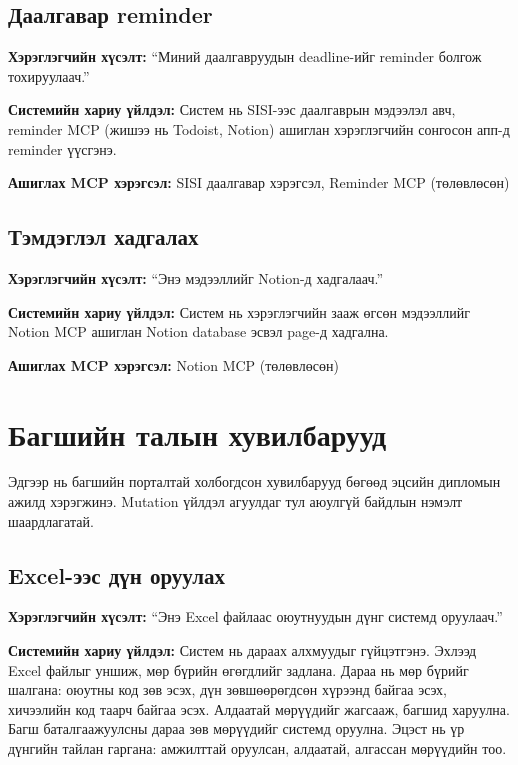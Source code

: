 \subsection{Даалгавар reminder}

\textbf{Хэрэглэгчийн хүсэлт:} ``Миний даалгавруудын deadline-ийг reminder болгож тохируулаач.''

\textbf{Системийн хариу үйлдэл:} Систем нь SISI-ээс даалгаврын мэдээлэл авч, reminder MCP (жишээ нь Todoist, Notion) ашиглан хэрэглэгчийн сонгосон апп-д reminder үүсгэнэ.

\textbf{Ашиглах MCP хэрэгсэл:} SISI даалгавар хэрэгсэл, Reminder MCP (төлөвлөсөн)

\subsection{Тэмдэглэл хадгалах}

\textbf{Хэрэглэгчийн хүсэлт:} ``Энэ мэдээллийг Notion-д хадгалаач.''

\textbf{Системийн хариу үйлдэл:} Систем нь хэрэглэгчийн зааж өгсөн мэдээллийг Notion MCP ашиглан Notion database эсвэл page-д хадгална.

\textbf{Ашиглах MCP хэрэгсэл:} Notion MCP (төлөвлөсөн)

\section{Багшийн талын хувилбарууд}

Эдгээр нь багшийн порталтай холбогдсон хувилбарууд бөгөөд эцсийн дипломын ажилд хэрэгжинэ. Mutation үйлдэл агуулдаг тул аюулгүй байдлын нэмэлт шаардлагатай.

\subsection{Excel-ээс дүн оруулах}

\textbf{Хэрэглэгчийн хүсэлт:} ``Энэ Excel файлаас оюутнуудын дүнг системд оруулаач.''

\textbf{Системийн хариу үйлдэл:} Систем нь дараах алхмуудыг гүйцэтгэнэ. Эхлээд Excel файлыг уншиж, мөр бүрийн өгөгдлийг задлана. Дараа нь мөр бүрийг шалгана: оюутны код зөв эсэх, дүн зөвшөөрөгдсөн хүрээнд байгаа эсэх, хичээлийн код таарч байгаа эсэх. Алдаатай мөрүүдийг жагсааж, багшид харуулна. Багш баталгаажуулсны дараа зөв мөрүүдийг системд оруулна. Эцэст нь үр дүнгийн тайлан гаргана: амжилттай оруулсан, алдаатай, алгассан мөрүүдийн тоо.

